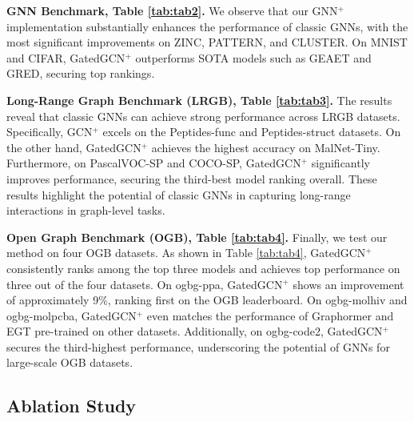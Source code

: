 \textbf{GNN Benchmark, Table \ref{tab:tab2}.}
We observe that our GNN$^+$ implementation substantially enhances the performance of classic GNNs, with the most significant improvements on ZINC, PATTERN, and CLUSTER. On MNIST and CIFAR, GatedGCN$^+$ outperforms SOTA models such as GEAET and GRED, securing top rankings.

\textbf{Long-Range Graph Benchmark (LRGB), Table \ref{tab:tab3}.} 
The results reveal that classic GNNs can achieve strong performance across LRGB datasets. Specifically, GCN$^+$ excels on the Peptides-func and Peptides-struct datasets. On the other hand, GatedGCN$^+$ achieves the highest accuracy on MalNet-Tiny. Furthermore, on PascalVOC-SP and COCO-SP, GatedGCN$^+$ significantly improves performance, securing the third-best model ranking overall. These results highlight the potential of classic GNNs in capturing long-range interactions in graph-level tasks.

\textbf{Open Graph Benchmark (OGB), Table \ref{tab:tab4}.}
Finally, we test our method on four OGB datasets. As shown in Table \ref{tab:tab4}, GatedGCN$^+$ consistently ranks among the top three models and achieves top performance on three out of the four datasets. On ogbg-ppa, GatedGCN$^+$ shows an improvement of approximately 9\%, ranking first on the OGB leaderboard. On ogbg-molhiv and ogbg-molpcba, GatedGCN$^+$ even matches the performance of Graphormer and EGT pre-trained on other datasets. Additionally, on ogbg-code2, GatedGCN$^+$ secures the third-highest performance, underscoring the potential of GNNs for large-scale OGB datasets.


\subsection{Ablation Study}\label{ablationsec}

